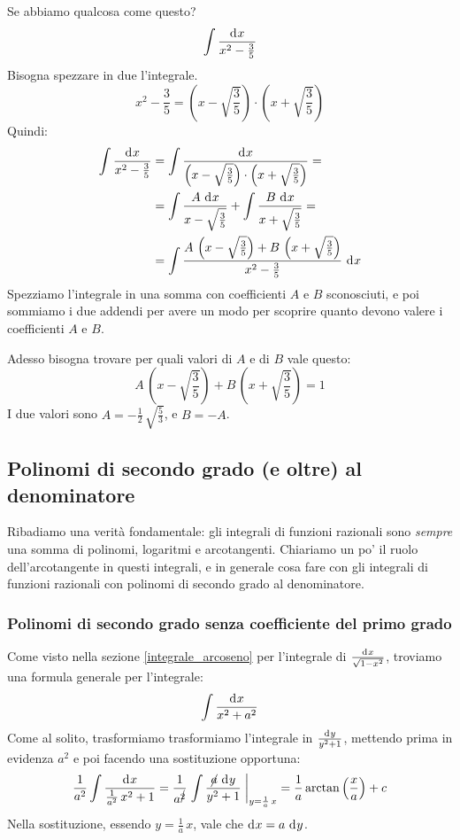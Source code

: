 \begin{exmp}
Se abbiamo qualcosa come questo?
\[
\int \frac{\diff x}{x^2 - \frac{3}{5}}
\]
Bisogna spezzare in due l'integrale.
\[
x^2 - \frac{3}{5} = 
\left( x - \sqrt{\frac{3}{5}} \right) \cdot \left( x + \sqrt{\frac{3}{5}} \right)
\]
Quindi:
\begin{align*}
\int \frac{\diff x}{x^2 - \frac{3}{5}} &= 
\int \frac{\diff x}{\left( x - \sqrt{\frac{3}{5}} \right) \cdot \left( x + \sqrt{\frac{3}{5}} \right)} = \\
&= \int \frac{A \dx}{x - \sqrt{\frac{3}{5}}} + \int \frac{B \dx}{x + \sqrt{\frac{3}{5}}} = \\
&= \int \frac{A \, \left( x - \sqrt{\frac{3}{5}} \right) + B \, \left( x + \sqrt{\frac{3}{5}} \right)}{x^2 - \frac{3}{5}} \dx 
\end{align*}
Spezziamo l'integrale in una somma con coefficienti $A$ e $B$ sconosciuti, e poi sommiamo i due addendi per avere un modo per scoprire quanto devono valere i coefficienti $A$ e $B$.

Adesso bisogna trovare per quali valori di $A$ e di $B$ vale questo:
\[
A \, \left( x - \sqrt{\frac{3}{5}} \right) + B \, \left( x + \sqrt{\frac{3}{5}} \right) = 1
\]
I due valori sono $A = - \frac{1}{2} \, \sqrt{\frac{5}{3}}$, e $B = -A$.
\end{exmp}

\subsection{Polinomi di secondo grado (e oltre) al denominatore}

Ribadiamo una verit\`a fondamentale: gli integrali di funzioni razionali sono \emph{sempre} una somma di polinomi, logaritmi e arcotangenti. Chiariamo un po' il ruolo dell'arcotangente in questi integrali, e in generale cosa fare con gli integrali di funzioni razionali con polinomi di secondo grado al denominatore.

\subsubsection{Polinomi di secondo grado senza coefficiente del primo grado}

Come visto nella sezione \ref{integrale_arcoseno} per l'integrale di $\frac{\diff x}{\sqrt{1 - x^2}}$, troviamo una formula generale per l'integrale:
\[
\int \frac{\diff x}{x^2 + a^2}
\]
Come al solito, trasformiamo trasformiamo l'integrale in $\frac{\diff y}{y^2 + 1}$, mettendo prima in evidenza $a^2$ e poi facendo una sostituzione opportuna:
\[
\frac{1}{a^2} \int \frac{\diff x}{\frac{1}{a^2} \, x^2 + 1} =
\frac{1}{a^{\cancel{2}}} \substitute{\int \frac{\cancel{a} \dx[y]}{y^2 + 1}}{y = \frac{1}{a} \, x} =
\frac{1}{a} \arctan \left( \frac{x}{a} \right) + c
\]
Nella sostituzione, essendo $y = \frac{1}{a} \, x$, vale che $\diff x = a \dx[y]$.

